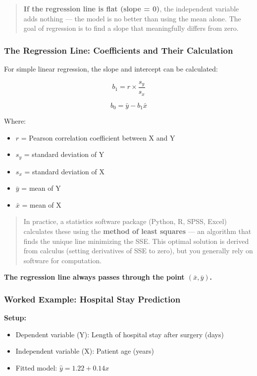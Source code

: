 \documentclass[12pt,openany]{book}
\begin{document}
\begin{quote}
\textbf{If the regression line is flat (slope = 0)}, the independent variable adds nothing --- the model is no better than using the mean alone. The goal of regression is to find a slope that meaningfully differs from zero.
\end{quote}


\medskip


\subsubsection{The Regression Line: Coefficients and Their Calculation}


For simple linear regression, the slope and intercept can be calculated:

\[
b_1 = r \times \frac{s_y}{s_x}
\]


\[
b_0 = \bar{y} - b_1 \bar{x}
\]


Where:
\begin{itemize}[leftmargin=*]
    \item \(r\) = Pearson correlation coefficient between X and Y
    \item \(s_y\) = standard deviation of Y
    \item \(s_x\) = standard deviation of X
    \item \(\bar{y}\) = mean of Y
    \item \(\bar{x}\) = mean of X

\end{itemize}

\begin{quote}
In practice, a statistics software package (Python, R, SPSS, Excel) calculates these using the \textbf{method of least squares} --- an algorithm that finds the unique line minimizing the SSE. This optimal solution is derived from calculus (setting derivatives of SSE to zero), but you generally rely on software for computation.
\end{quote}


\textbf{The regression line always passes through the point \((\bar{x}, \bar{y})\).}

\medskip


\subsubsection{Worked Example: Hospital Stay Prediction}


\textbf{Setup:}
\begin{itemize}[leftmargin=*]
    \item Dependent variable (Y): Length of hospital stay after surgery (days)
    \item Independent variable (X): Patient age (years)
    \item Fitted model: \(\hat{y} = 1.22 + 0.14x\)

\end{itemize}
\end{document}

